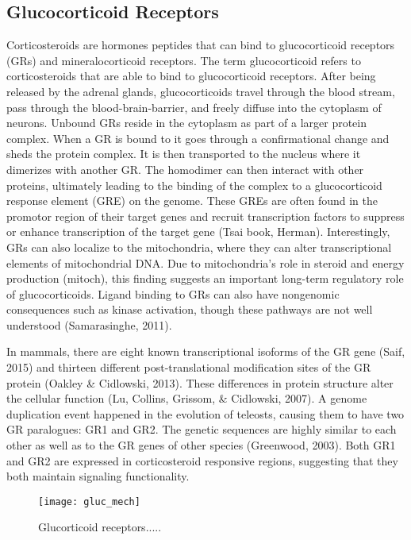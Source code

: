 \documentclass[12pt,twoside]{reedthesis}
\begin{document}
\subsection{Glucocorticoid Receptors}
Corticosteroids are hormones peptides that can bind to glucocorticoid receptors (GRs)
and mineralocorticoid receptors. The term glucocorticoid refers to
corticosteroids that are able to bind to glucocorticoid receptors. After being
released by the adrenal glands, glucocorticoids travel through the blood stream,
pass through the blood-brain-barrier, and freely diffuse into the cytoplasm of
neurons. Unbound GRs reside in the cytoplasm as part of a larger protein
complex. When a GR is bound to it goes through a
confirmational change and sheds the protein complex. It is then
transported to the nucleus where it dimerizes with another GR. The homodimer
can then interact with other proteins, ultimately leading to the binding of the
complex to a glucocorticoid response element (GRE) on the genome. These GREs are often
found in the promotor region of their target genes and recruit
transcription factors to suppress or enhance transcription of the target gene
(Tsai book, Herman). Interestingly, GRs can also localize to the mitochondria,
where they can alter transcriptional elements of mitochondrial DNA. Due to
mitochondria's role in steroid and energy production (mitoch), this finding
suggests an important long-term regulatory role of glucocorticoids. Ligand binding to GRs can also have nongenomic consequences such as kinase
activation, though these pathways are not well understood (Samarasinghe, 2011).

In mammals, there are eight known transcriptional isoforms of the GR gene (Saif,
2015) and
thirteen different post-translational modification sites of the GR protein (Oakley \&
Cidlowski, 2013). These differences in protein structure alter the
cellular function (Lu, Collins, Grissom, \& Cidlowski, 2007). A genome duplication event happened in the evolution of teleosts, causing them
to have two GR paralogues: GR1 and GR2. The genetic sequences are
highly similar to each other as well as to the GR genes of other species (Greenwood,
2003).
Both GR1 and GR2 are expressed in corticosteroid
responsive regions,
suggesting that they both maintain signaling functionality.

\begin{figure}[htbp] 
\begin{centering} 
\texttt{[image: gluc\_mech]}
\caption[Glucocorticoid Receptor Mechanism of Action]{Glucorticoid receptors.....} 
\label{subd}
\end{centering} 
\end{figure}
\end{document}
